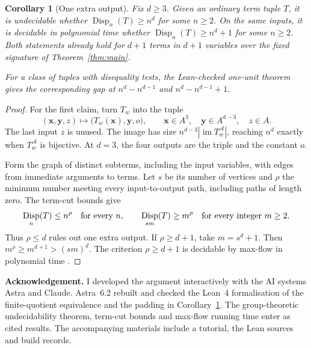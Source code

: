 \documentclass[a4paper,11pt]{article}
\newtheorem{corollary}[theorem]{Corollary}
\DeclareMathOperator{\Disp}{Disp}
\newcommand{\A}{\mathcal A}
\begin{document}
\begin{corollary}[One extra output]\label{cor:gap}
Fix \(d\ge3\). Given an ordinary term tuple \(T\), it is undecidable whether \(\Disp_n(T)\ge n^d\) for some \(n\ge2\). On the same inputs, it is decidable in polynomial time whether \(\Disp_n(T)\ge n^d+1\) for some \(n\ge2\). Both statements already hold for \(d+1\) terms in \(d+1\) variables over the fixed signature of Theorem~\ref{thm:main}.
\par\smallskip\noindent\normalfont
For a class of tuples with disequality tests, the Lean-checked one-unit theorem \cite[Theorem~1.1]{oneunit} gives the corresponding gap at \(n^d-n^{d-1}\) and \(n^d-n^{d-1}+1\).
\end{corollary}
\begin{proof}
For the first claim, turn \(T_w\) into the tuple
\[
          (\mathbf x,\mathbf y,z)\longmapsto
          \bigl(T_w(\mathbf x),\mathbf y,o\bigr),
 \qquad \mathbf x\in A^3,\quad \mathbf y\in A^{d-3},\quad z\in A.
\]
The last input \(z\) is unused. The image has size \(n^{d-3}|\operatorname{im}T_w^\A|\), reaching \(n^d\) exactly when \(T_w^\A\) is bijective. At \(d=3\), the four outputs are the triple and the constant \(o\).

Form the graph of distinct subterms, including the input variables, with edges from immediate arguments to terms. Let \(s\) be its number of vertices and \(\rho\) the minimum number meeting every input-to-output path, including paths of length zero. The term-cut bounds \cite[Theorem~5.5]{TC} give
\[
          \Disp_n(T)\le n^\rho\quad\hbox{for every }n,\qquad
          \Disp_{s m}(T)\ge m^\rho\quad\hbox{for every integer }m\ge2.
\]
Thus \(\rho\le d\) rules out one extra output. If \(\rho\ge d+1\), take \(m=s^d+1\). Then \(m^\rho\ge m^{d+1}>(sm)^d\). The criterion \(\rho\ge d+1\) is decidable by max-flow in polynomial time \cite[\S5.5]{TC}.
\end{proof}

\smallskip\noindent\textbf{Acknowledgement.}
I developed the argument interactively with the AI systems Astra and Claude. Astra~6.2 rebuilt and checked the Lean~4 formalisation of the finite-quotient equivalence and the padding in Corollary~\ref{cor:gap}. The group-theoretic undecidability theorem, term-cut bounds and max-flow running time enter as cited results. The accompanying materials include a tutorial, the Lean sources and build records.
\end{document}
